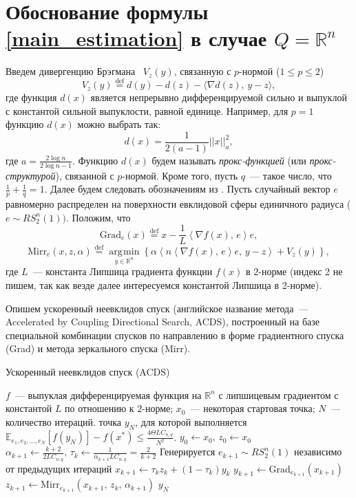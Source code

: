 \documentclass[11pt]{article}
\newcommand{\E}{\mathbb{E}}
\newcommand{\RR}{\mathbb{R}}
\newcommand{\argmin}{\mathop{\arg\!\min}}
\begin{document}
	\section{Обоснование формулы \eqref{main_estimation} в случае $Q = \RR^n$}
	Введем дивергенцию Брэгмана~\cite{Bregman} $V_z \left( y \right)$, связанную с $p$-нормой ($1\leqslant p \leqslant 2$)
	$$
	V_z(y) \overset{\text{def}}{=} d(y) - d(z) - \langle\nabla d(z), \, y-z\rangle,
	$$
	где функция $d(x)$ является непрерывно дифференцируемой сильно и выпуклой с константой сильной выпуклости, равной единице. Например, для $p=1$ функцию $d(x)$ можно выбрать так:
	$$
	d(x) = \frac{1}{2(a-1)}||x||_a^2,
	$$
	где $a = \frac{2\log n}{2\log n - 1}$. Функцию $d(x)$ будем называть \textit{прокс-функцией} (или \textit{прокс-структурой}), связанной с $p$-нормой. Кроме того, пусть $q$~--- такое число, что $\frac{1}{p}+\frac{1}{q}=1$.  Далее будем следовать обозначениям из \cite{about-non-triviality}. Пусть случайный вектор $e$ равномерно распределен на поверхности евклидовой сферы единичного 
	радиуса ($e\sim RS_2^n \left( 1 \right))$. Положим, что
	\[
	\mbox{Grad}_e \left( x \right)\overset{\text{def}}{=}x-\frac{1}{L }\left\langle {\nabla f\left( 
		x \right), \, e} \right\rangle e,
	\]
	\[
	\mbox{Mirr}_e \left( {x,z,\alpha } \right)\overset{\text{def}}{=} \argmin\limits_{y\in\RR^n} \left\{ {\alpha \left\langle {n\left\langle {\nabla f\left( x 
				\right), \, e} \right\rangle e, \, y-z} \right\rangle +V_z \left( y \right)} 
	\right\},
	\]
	где $L$~--- константа Липшица градиента функции $f(x)$ в $2$-норме (индекс 2 не пишем, так как везде далее интересуемся константой Липшица в 2-норме).
	
	Опишем ускоренный неевклидов спуск (английское название метода~--- Accelerated by Coupling Directional Search, ACDS), построенный на базе специальной комбинации спусков по 
	направлению в форме градиентного спуска (Grad) и метода зеркального спуска (Mirr).
	\begin{algorithm}
		\caption{Ускоренный неевклидов спуск (ACDS)}\label{ACRCD}
		\begin{algorithmic}[1]
			
			\Require $f$~--- выпуклая дифференцируемая функция на $\RR^n$ с липшицевым градиентом с константой $L$ по отношению к $2$-норме; $x_0$~--- некоторая стартовая точка; $N$~--- количество итераций.
			\Ensure точка $y_N$, для которой выполняется $\E_{e_1,e_2,\ldots,e_N}[f(y_N)] - f(x^*) \leqslant \frac{4\Theta LC_{n,q}}{N^2}$.
			\State $y_0 \leftarrow x_0, \, z_0 \leftarrow x_0$
			\State $\alpha_{k+1} \leftarrow \frac{k+2}{2LC_{n,q}}, \, \tau_{k} \leftarrow \frac{1}{\alpha_{k+1}LC_{n,q}} = \frac{2}{k+2}$
			\State Генерируется $e_{k+1} \sim RS_2^n \left( 1 \right)$ независимо от предыдущих итераций
			\State $x_{k+1} \leftarrow \tau_kz_k + (1-\tau_k)y_k $
			\State $y_{k+1} \leftarrow \text{Grad}_{e_{k+1}}(x_{k+1})$
			\State $z_{k+1} \leftarrow \text{Mirr}_{e_{k+1}}(x_{k+1}, \, z_{k}, \, \alpha_{k+1})$
			\EndFor
			\State\Return $y_N$
		\end{algorithmic}
	\end{algorithm}
	
\end{document}
